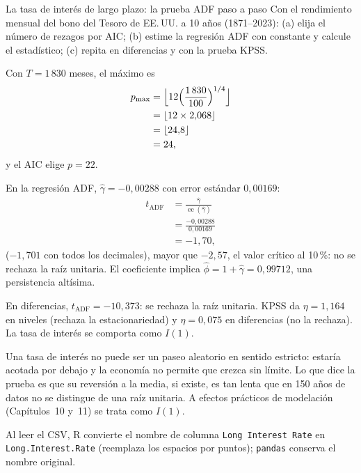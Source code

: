 \begin{ejresuelto}{La tasa de interés de largo plazo: la prueba ADF paso a paso}\label{ej:tasaur}
\enunciado Con el rendimiento mensual del bono del Tesoro de EE.\,UU. a 10 años (1871--2023): (a) elija el
número de rezagos por AIC; (b) estime la regresión ADF con constante y calcule el estadístico; (c) repita en
diferencias y con la prueba KPSS.

\solucion
{} Con $T=1\,830$ meses, el máximo es
\begin{align*}
  p_{\max} &= \Bigl\lfloor 12\Bigl(\frac{1\,830}{100}\Bigr)^{1/4}\Bigr\rfloor\\
           &= \lfloor 12\times2{,}068\rfloor\\
           &= \lfloor 24{,}8\rfloor\\
           &= 24,
\end{align*}
y el AIC elige $p=22$.

 En la regresión ADF, $\hat\gamma=-0{,}00288$ con error estándar $0{,}00169$:
\begin{align*}
  t_{\mathrm{ADF}} &= \frac{\hat\gamma}{\operatorname{ee}(\hat\gamma)}\\
                   &= \frac{-0{,}00288}{0{,}00169}\\
                   &= -1{,}70,
\end{align*}
($-1{,}701$ con todos los decimales), mayor que $-2{,}57$, el valor crítico al 10\,\%: no se rechaza la raíz
unitaria. El coeficiente implica $\hat\phi=1+\hat\gamma=0{,}99712$, una persistencia altísima.

 En diferencias, $t_{\mathrm{ADF}}=-10{,}373$: se rechaza la raíz unitaria.
KPSS da $\eta=1{,}164$ en niveles (rechaza la estacionariedad) y $\eta=0{,}075$ en diferencias (no la
rechaza). La tasa de interés se comporta como $I(1)$.

 Una tasa de interés no puede ser un paseo aleatorio en sentido estricto:
estaría acotada por debajo y la economía no permite que crezca sin límite. Lo que dice la prueba es que su
reversión a la media, si existe, es tan lenta que en 150 años de datos no se distingue de una raíz unitaria.
A efectos prácticos de modelación (Capítulos~10 y~11) se trata como $I(1)$.


\RvsPy Al leer el CSV, R convierte el nombre de columna \texttt{Long Interest Rate} en
\texttt{Long.Interest.Rate} (reemplaza los espacios por puntos); \texttt{pandas} conserva el nombre original.


\end{ejresuelto}
